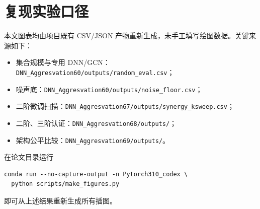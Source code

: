 \documentclass[UTF8,a4paper,zihao=5,fontset=fandol]{ctexart}
\begin{document}


\appendix
\section{复现实验口径}

本文图表均由项目既有 CSV/JSON 产物重新生成，未手工填写绘图数据。关键来源如下：
\begin{itemize}
  \item 集合规模与专用 DNN/GCN：\texttt{DNN\_Aggresvation60/outputs/random\_eval.csv}；
  \item 噪声底：\texttt{DNN\_Aggresvation60/outputs/noise\_floor.csv}；
  \item 二阶微调扫描：\texttt{DNN\_Aggresvation67/outputs/synergy\_ksweep.csv}；
  \item 二阶、三阶认证：\texttt{DNN\_Aggresvation68/outputs/}；
  \item 架构公平比较：\texttt{DNN\_Aggresvation69/outputs/}。
\end{itemize}
在论文目录运行
\begin{verbatim}
conda run --no-capture-output -n Pytorch310_codex \
  python scripts/make_figures.py
\end{verbatim}
即可从上述结果重新生成所有插图。
\end{document}
